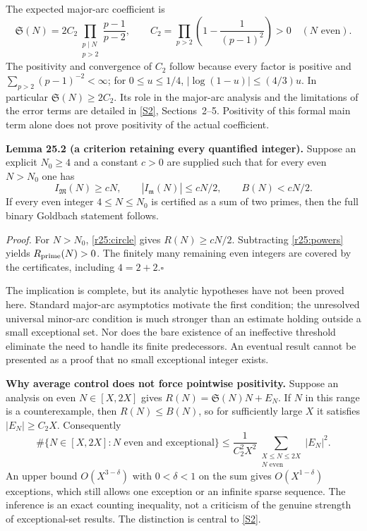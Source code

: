 \documentclass[11pt,a4paper]{article}
\newcommand{\N}{\mathbb{N}}
\newcommand{\sref}[2]{\hyperlink{source:#1:#2}{[S#2]}}
\numberwithin{equation}{section}
\begin{document}
The expected major-arc coefficient is
\begin{equation}\label{r25:singular}
 \mathfrak S(N)=2C_2\prod_{\substack{p\mid N\\p>2}}\frac{p-1}{p-2},
 \qquad C_2=\prod_{p>2}\left(1-\frac1{(p-1)^2}\right)>0
 \quad(N\text{ even}).
\end{equation}
The positivity and convergence of $C_2$ follow because every factor is
positive and $\sum_{p>2}(p-1)^{-2}<\infty$; for $0\le u\le1/4$,
$|\log(1-u)|\le(4/3)u$. In particular $\mathfrak S(N)\ge2C_2$.
Its role in the major-arc analysis and the limitations of the error terms
are detailed in \sref{12}{2}, Sections~2--5. Positivity of this formal
main term alone does not prove positivity of the actual coefficient.

\textbf{Lemma 25.2 (a criterion retaining every quantified integer).}
Suppose an explicit $N_0\ge4$ and a constant $c>0$ are supplied such that
for every even $N>N_0$ one has
\begin{equation}\label{r25:missing}
 I_{\mathfrak M}(N)\ge cN,\qquad
 |I_{\mathfrak m}(N)|\le cN/2,\qquad B(N)<cN/2.
\end{equation}
If every even integer $4\le N\le N_0$ is certified as a sum of two
primes, then the full binary Goldbach statement follows.

\emph{Proof.} For $N>N_0$, \eqref{r25:circle} gives $R(N)\ge cN/2$.
Subtracting \eqref{r25:powers} yields $R_{\rm prime}(N)>0$. The finitely
many remaining even integers are covered by the certificates, including
$4=2+2$.\hfill$\square$

The implication is complete, but its analytic hypotheses have not been
proved here. Standard major-arc asymptotics motivate the first condition;
the unresolved universal minor-arc condition is much stronger than an
estimate holding outside a small exceptional set. Nor does the bare
existence of an ineffective threshold eliminate the need to handle its
finite predecessors. An eventual result cannot be presented as a proof
that no small exceptional integer exists.

\medskip
\textbf{Why average control does not force pointwise positivity.}
Suppose an analysis on even $N\in[X,2X]$ gives
$R(N)=\mathfrak S(N)N+E_N$. If $N$ in this range is a counterexample,
then $R(N)\le B(N)$, so for sufficiently large $X$ it satisfies
$|E_N|\ge C_2X$. Consequently
\begin{equation}\label{r25:exceptional}
 \#\{N\in[X,2X]:N\text{ even and exceptional}\}
 \le\frac1{C_2^2X^2}\sum_{\substack{X\le N\le2X\\N\text{ even}}}|E_N|^2.
\end{equation}
An upper bound $O(X^{3-\delta})$ with $0<\delta<1$ on the sum gives
$O(X^{1-\delta})$ exceptions, which still allows one exception or an
infinite sparse sequence. The inference is an exact counting inequality,
not a criticism of the genuine strength of exceptional-set results.
The distinction is central to \sref{12}{2}.
\end{document}
